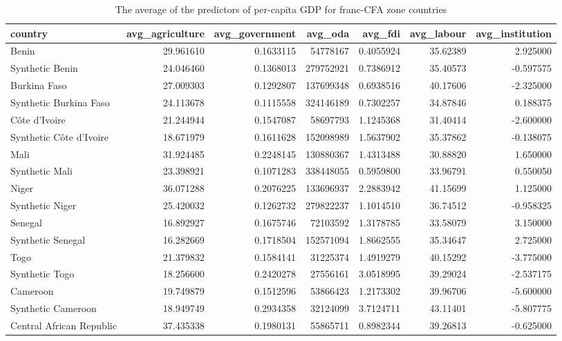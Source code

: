 \begin{table}

\caption{The average of the predictors of per-capita GDP for franc-CFA zone countries}
\centering
\begin{tabular}[t]{lrrrrrr}
\toprule
country & avg\_agriculture & avg\_government & avg\_oda & avg\_fdi & avg\_labour & avg\_institution\\
\midrule
Benin & 29.961610 & 0.1633115 & 54778167 & 0.4055924 & 35.62389 & 2.925000\\
Synthetic Benin & 24.046460 & 0.1368013 & 279752921 & 0.7386912 & 35.40573 & -0.597575\\
Burkina Faso & 27.009303 & 0.1292807 & 137699348 & 0.6938516 & 40.17606 & -2.325000\\
Synthetic Burkina Faso & 24.113678 & 0.1115558 & 324146189 & 0.7302257 & 34.87846 & 0.188375\\
Côte d'Ivoire & 21.244944 & 0.1547087 & 58697793 & 1.1245368 & 31.40414 & -2.600000\\
\addlinespace
Synthetic Côte d'Ivoire & 18.671979 & 0.1611628 & 152098989 & 1.5637902 & 35.37862 & -0.138075\\
Mali & 31.924485 & 0.2248145 & 130880367 & 1.4313488 & 30.88820 & 1.650000\\
Synthetic Mali & 23.398921 & 0.1071283 & 338448055 & 0.5959800 & 33.96791 & 0.550050\\
Niger & 36.071288 & 0.2076225 & 133696937 & 2.2883942 & 41.15699 & 1.125000\\
Synthetic Niger & 25.420032 & 0.1262732 & 279822237 & 1.1014510 & 36.74512 & -0.958325\\
\addlinespace
Senegal & 16.892927 & 0.1675746 & 72103592 & 1.3178785 & 33.58079 & 3.150000\\
Synthetic Senegal & 16.282669 & 0.1718504 & 152571094 & 1.8662555 & 35.34647 & 2.725000\\
Togo & 21.379832 & 0.1584141 & 31225374 & 1.4919279 & 40.15292 & -3.775000\\
Synthetic Togo & 18.256600 & 0.2420278 & 27556161 & 3.0518995 & 39.29024 & -2.537175\\
Cameroon & 19.749879 & 0.1512596 & 53866423 & 1.2173302 & 39.96706 & -5.600000\\
\addlinespace
Synthetic Cameroon & 18.949749 & 0.2934358 & 32124099 & 3.7124711 & 43.11401 & -5.807775\\
Central African Republic & 37.435338 & 0.1980131 & 55865711 & 0.8982344 & 39.26813 & -0.625000\\

\end{tabular}
\end{table}
